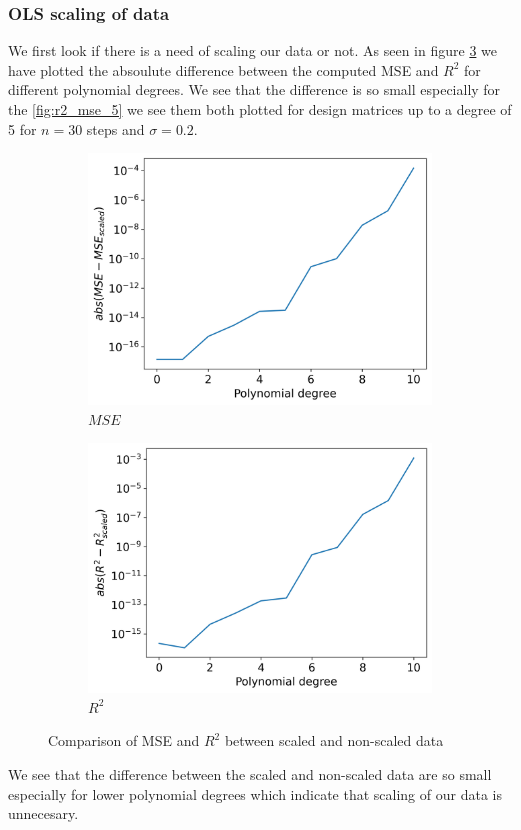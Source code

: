 \documentclass[12pt]{article}
\begin{document}
\subsubsection{OLS scaling of data}
We first look if there is a need of scaling our data or not. As seen in figure \ref{fig:compare_scale} we have plotted the absoulute difference between the computed MSE and $R^2$ for different polynomial degrees. We see that the difference is so small especially for the
\ref{fig:r2_mse_5} we see them both plotted for design matrices up to a degree of 5 for $n=30$ steps and $\sigma=0.2$.
\begin{figure}[H]
  \begin{subfigure}{.5\textwidth}
    \centering
    \includegraphics[width=\textwidth]{../figures/compare_scale_mse.png}
    \caption{$MSE$}
    \label{fig:}
  \end{subfigure}
  \begin{subfigure}{.5\textwidth}
    \centering
    \includegraphics[width=\textwidth]{../figures/compare_scale_r2.png}
    \caption{$R^2$}
    \label{fig:}
  \end{subfigure}
  \caption{Comparison of MSE and $R^2$ between scaled and non-scaled data}
  \label{fig:compare_scale}
\end{figure}
We see that the difference between the scaled and non-scaled data are so small especially for lower polynomial degrees which indicate that scaling of our data is unnecesary.
\end{document}
